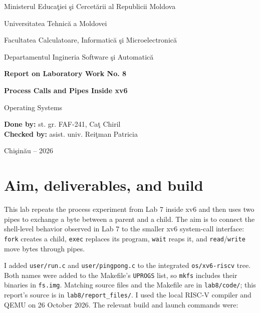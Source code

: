 \documentclass[12pt]{article}
\begin{document}
\begin{titlepage}
\centering
{\large Ministerul Educa\c{t}iei \c{s}i Cercet\u{a}rii al Republicii Moldova\par}
\vspace{0.45cm}
{\large Universitatea Tehnic\u{a} a Moldovei\par}
\vspace{0.45cm}
{\large Facultatea Calculatoare, Informatic\u{a} \c{s}i Microelectronic\u{a}\par}
\vspace{0.45cm}
{\large Departamentul Ingineria Software \c{s}i Automatic\u{a}\par}
\vspace{3cm}
{\Large\bfseries Report on Laboratory Work No. 8\par}
\vspace{0.55cm}
{\LARGE\bfseries Process Calls and Pipes Inside xv6\par}
\vspace{0.35cm}
{\large Operating Systems\par}
\vfill
\begin{flushleft}
\textbf{Done by:} st. gr. FAF-241, Ca\c{t} Chiril\\[0.8cm]
\textbf{Checked by:} asist. univ. Rei\c{t}man Patricia
\end{flushleft}
\vfill
{Chi\c{s}in\u{a}u -- 2026\par}
\end{titlepage}

\tableofcontents
\clearpage
{}

\section{Aim, deliverables, and build}
This lab repeats the process experiment from Lab 7 inside xv6 and then
uses two pipes to exchange a byte between a parent and a child. The aim is
to connect the shell-level behavior observed in Lab 7 to the smaller xv6
system-call interface: \texttt{fork} creates a child, \texttt{exec}
replaces its program, \texttt{wait} reaps it, and \texttt{read}/\texttt{write}
move bytes through pipes.

I added \texttt{user/run.c} and \texttt{user/pingpong.c} to the integrated
\texttt{os/xv6-riscv} tree. Both names were added to the Makefile's
\texttt{UPROGS} list, so \texttt{mkfs} includes their binaries in
\texttt{fs.img}. Matching source files and the Makefile are in
\texttt{lab8/code/}; this report's source is in
\texttt{lab8/report\_files/}. I used the local RISC-V compiler and QEMU
on 26 October 2026. The relevant build and launch commands were:
\end{document}
